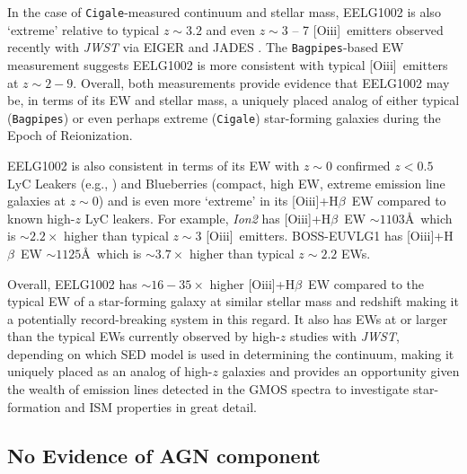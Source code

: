 \documentclass[twocolumn,tight,times,linenumbers]{aastex631}
\newcommand{\hbeta}{H$\beta$}
\newcommand{\oiii}{[O{\sc iii}]}
\newcommand{\cigale}{\texttt{Cigale}}
\newcommand{\bagpipes}{\texttt{Bagpipes}}
\begin{document}
		In the case of \cigale-measured continuum and stellar mass, EELG1002 is also `extreme' relative to typical $z \sim 3.2$ \citep{Khostovan2016} and even $z \sim 3$ -- 7 \oiii~emitters observed recently with \textit{JWST} via EIGER \citep{Matthee2023}  and JADES \citep{Boyett2024}. The \bagpipes-based EW measurement suggests EELG1002 is more consistent with typical \oiii~emitters at $z \sim 2 - 9$. Overall, both measurements provide evidence that EELG1002 may be, in terms of its EW and stellar mass, a uniquely placed analog of either typical (\bagpipes) or even perhaps extreme (\cigale) star-forming galaxies during the Epoch of Reionization.
		
		EELG1002 is also consistent in terms of its EW with $z \sim 0$ confirmed $z< 0.5$ LyC Leakers (e.g., \citealt{Izotov2016,Izotov2018,Izotov2021}) and Blueberries \citep{Yang2017_BB} (compact, high EW, extreme emission line galaxies at $z \sim 0$) and is even more `extreme' in its \oiii+\hbeta~EW compared to known high-$z$ LyC leakers. For example, \textit{Ion2} \citep{deBarros2016} has \oiii+\hbeta~EW $\sim 1103$\AA~which is $\sim 2.2\times$ higher than typical $z \sim 3$ \oiii~emitters. BOSS-EUVLG1 \citep{Marques-Chaves2020} has \oiii+\hbeta~EW $\sim 1125$\AA~which is $\sim 3.7\times$ higher than typical $z \sim 2.2$ EWs.
		
		Overall, EELG1002 has $\sim 16 - 35 \times$ higher \oiii+\hbeta~EW compared to the typical EW of a star-forming galaxy at similar stellar mass and redshift making it a potentially record-breaking system in this regard. It also has EWs at or larger than the typical EWs currently observed by high-$z$ studies with \textit{JWST}, depending on which SED model is used in determining the continuum, making it uniquely placed as an analog of high-$z$ galaxies and provides an opportunity given the wealth of emission lines detected in the GMOS spectra to investigate star-formation and ISM properties in great detail.


		\subsection{No Evidence of AGN component}
		\label{sec:AGN}
		
\end{document}

